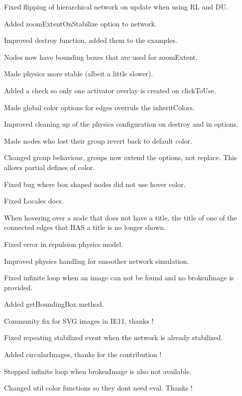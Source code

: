\begin{DoxyItemize}
\item Fixed flipping of hierarchical network on update when using RL and DU.
\item Added zoom\+Extent\+On\+Stabilize option to network.
\item Improved destroy function, added them to the examples.
\item Nodes now have bounding boxes that are used for zoom\+Extent.
\item Made physics more stable (albeit a little slower).
\item Added a check so only one \textquotesingle{}activator\textquotesingle{} overlay is created on click\+To\+Use.
\item Made global color options for edges overrule the inherit\+Colors.
\item Improved cleaning up of the physics configuration on destroy and in options.
\item Made nodes who lost their group revert back to default color.
\item Changed group behaviour, groups now extend the options, not replace. This allows partial defines of color.
\item Fixed bug where box shaped nodes did not use hover color.
\item Fixed Locales docs.
\item When hovering over a node that does not have a title, the title of one of the connected edges that H\+AS a title is no longer shown.
\item Fixed error in repulsion physics model.
\item Improved physics handling for smoother network simulation.
\item Fixed infinite loop when an image can not be found and no broken\+Image is provided.
\item Added get\+Bounding\+Box method.
\item Community fix for S\+VG images in I\+E11, thanks !
\item Fixed repeating stabilized event when the network is already stabilized.
\item Added circular\+Images, thanks for the contribution !
\item Stopped infinite loop when broken\+Image is also not available.
\item Changed util color functions so they don\textquotesingle{}t need eval. Thanks !
\end{DoxyItemize}

